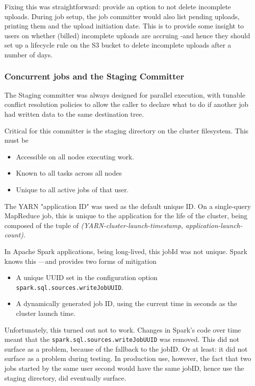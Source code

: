 \documentclass[format=acmsmall, screen=true, nonacm, timestamp, review=false]{acmart}
\begin{document}
Fixing this was straightforward: provide an option to not delete incomplete
uploads.
During job setup, the job committer would also list pending
uploads, printing them and the upload initiation date.
This is to provide some insight to users on whether (billed) incomplete uploads
are accruing -and hence they should set up a lifecycle rule on the S3 bucket
to delete incomplete uploads after a number of days.

\subsubsection{Concurrent jobs and the Staging Committer}

The Staging committer was always designed for parallel execution,
with tunable conflict resolution policies to allow the caller to
declare what to do if another job had written data to the same
destination tree.

Critical for this committer is the staging directory on the cluster filesystem.
This must be

\begin{itemize}
    \item Accessible on all nodes executing work.
    \item Known to all tasks across all nodes
    \item Unique to all active jobs of that user.
\end{itemize}

The YARN "application ID" was used as the default unique ID.
On a single-query MapReduce job, this is unique to the application
for the life of the cluster, being composed of the tuple of
\em{(YARN-cluster-launch-timestamp, application-launch-count)}.

In Apache Spark applications, being long-lived, this jobId was not unique.
Spark knows this ---and provides two forms of mitigation
\begin{itemize}
    \item A unique UUID set in the configuration option \texttt{spark.sql.sources.writeJobUUID}.
    \item A dynamically generated job ID, using the current time in seconds as the cluster launch time.
\end{itemize}

Unfortunately, this turned out not to work.
Changes in Spark's code over
time meant that the \texttt{spark.sql.sources.writeJobUUID} was removed.
This did not surface as a problem, because of the fallback to the jobID.
Or at least: it did not surface as a problem during testing.
In production use, however, the fact that two jobs started by the same user
second would have the same jobID, hence use the staging directory,
did eventually surface.
\end{document}
